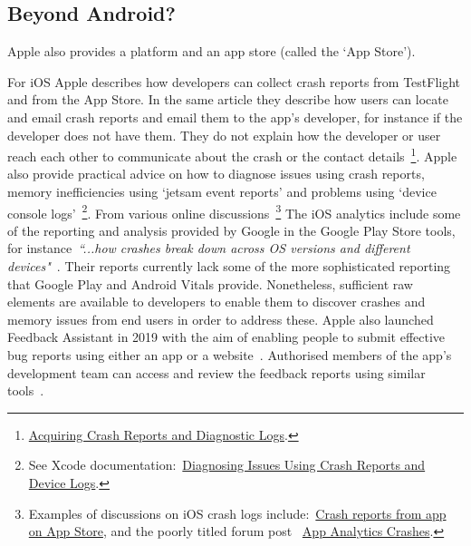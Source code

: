 \subsection{Beyond Android?}

Apple also provides a platform and an app store (called the `App Store'). 

For iOS Apple describes how developers can collect crash reports from TestFlight and from the App Store. In the same article they describe how users can locate and email crash reports and email them to the app's developer, for instance if the developer does not have them. They do not explain how the developer or user reach each other to communicate about the crash or the contact details~\footnote{\href{https://developer.apple.com/documentation/xcode/diagnosing_issues_using_crash_reports_and_device_logs/acquiring_crash_reports_and_diagnostic_logs}{Acquiring Crash Reports and Diagnostic Logs}.}. 
%
Apple also provide practical advice on how to diagnose issues using crash reports, memory inefficiencies using `jetsam event reports' and problems using `device console logs'~\footnote{See Xcode documentation:~\href{https://developer.apple.com/documentation/xcode/diagnosing_issues_using_crash_reports_and_device_logs}{Diagnosing Issues Using Crash Reports and Device Logs}.}. 
% 
From various online discussions~\footnote{Examples of discussions on iOS crash logs include:~\href{https://stackoverflow.com/questions/10145665/crash-reports-from-app-on-app-store}{Crash reports from app on App Store}, and the poorly titled forum post ~\href{https://developer.apple.com/forums/thread/30934}{App Analytics Crashes}.} 
The iOS analytics include some of the reporting and analysis provided by Google in the Google Play Store tools, for instance~\emph{``...how crashes break down across OS versions and different devices"}~\cite{apple2020_how_to_review_your_apps_crash_logs}. Their reports currently lack some of the more sophisticated reporting that Google Play and Android Vitals provide. Nonetheless, sufficient raw elements are available to developers to enable them to discover crashes and memory issues from end users in order to address these. Apple also launched Feedback Assistant in 2019 with the aim of enabling people to submit effective bug reports using either an app or a website~\cite{appledeveloper2020_bug_reporting_feedback_assistant_for_developers}. Authorised members of the app's development team can access and review the feedback reports using similar tools~\cite{appledeveloper2020_bug_reporting_feedback_assistant_for_developers}.



